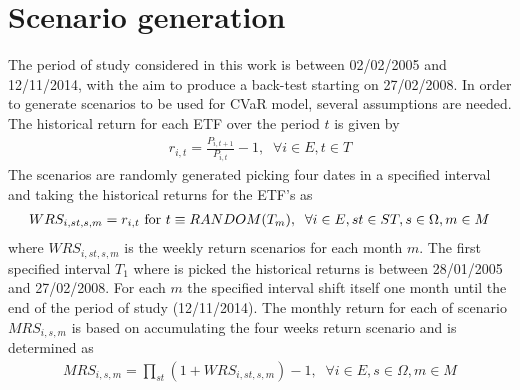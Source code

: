 \section{Scenario generation}\label{sec:ScenGen}

The period of study considered in this work is  between 02/02/2005 and 12/11/2014, with the aim to produce a back-test starting on 27/02/2008.
In order to generate scenarios to be used for CVaR model, several assumptions are needed. The historical return for each ETF over the period $t$ is given by
\begin{gather}
r_{i,t} = \frac{P_{i,t+1}}{P_{i,t}}-1, \;\; \forall i \in E, t \in T
\end{gather}
The scenarios are randomly generated picking four dates in a specified interval and taking the historical returns for the ETF's as
\begin{gather}
WRS_{i,st,s,m} = r_{i,t}  \textup{ for } t \equiv RANDOM(T_{m}), \;\; \forall i \in E, st \in ST, s \in \Omega, m \in M
\end{gather}
where $WRS_{i,st,s,m}$ is the weekly return scenarios for each month $m$.
The first specified interval $T_1$ where is picked the historical returns is between 28/01/2005 and 27/02/2008.
For each $m$ the specified interval shift itself one month until the end of the period of study (12/11/2014).
The monthly return for each of scenario $MRS_{i,s,m}$ is based on accumulating the four weeks return scenario and is determined as
\begin{gather}
MRS_{i,s,m} = \prod_{st} (1+WRS_{i,st,s,m}) -1, \;\; \forall i \in E, s \in \Omega, m \in M
\end{gather}
